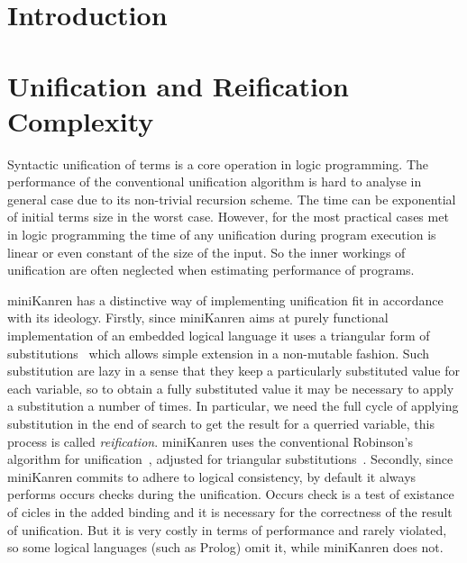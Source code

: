 \documentclass[acmsmall, anonymous, review]{acmart}
\newcommand{\mK}{miniKanren\xspace}
\begin{document}
\maketitle

\section{Introduction}





\section{Unification and Reification Complexity}

Syntactic unification of terms is a core operation in logic programming. The performance of the  conventional unification algorithm is hard to analyse in general case due to its non-trivial recursion scheme. The time can be exponential of initial terms size in the worst case. However, for the most practical cases met in logic programming the time of any unification during program execution is linear or even constant of the size of the input. So the inner workings of unification are often neglected when estimating performance of programs.

\mK has a distinctive way of implementing unification fit in accordance with its ideology. Firstly, since \mK aims at purely functional implementation of an embedded logical language it uses a triangular form of substitutions~\cite{UnificationTheory} which allows simple extension in a non-mutable fashion. Such substitution are lazy in a sense that they keep a particularly substituted value for each variable, so to obtain a fully substituted value it may be necessary to apply a substitution a number of times. In particular, we need the full cycle of applying substitution in the end of search to get the result for a querried variable, this process is called \emph{reification}. \mK uses the conventional Robinson's algorithm for unification~\cite{UnificationTheory}, adjusted for triangular substitutions~\cite{TRS}. Secondly, since \mK commits to adhere to logical consistency, by default it always performs occurs checks during the unification. Occurs check is a test of existance of cicles in the added binding and it is necessary for the correctness of the result of unification. But it is very costly in terms of performance and rarely violated, so some logical languages (such as Prolog) omit it, while \mK does not.
\end{document}
